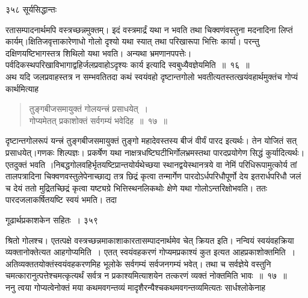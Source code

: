 \documentclass[11pt, openany]{book}
\begin{document}
\newpage


\noindent ३५८ \hspace{4cm} सूर्यसिद्धान्तः
\vspace{1cm}


\noindent रतासम्पादनार्थमपि वस्त्रच्छन्नमुक्तम्। इदं वस्त्रमार्द्रं यथा न भवति तथा चिक्वणंवस्तुना मदनादिना लिप्तं कार्यम्।क्षितिजवृत्ताकारेणाधो गोलो दृश्यो यथा स्यात् तथा परिखारूपा भित्तिः कार्या। परन्तु दक्षिणयष्टिभागस्तत्र शिथिलो यथा भवति। अन्यथा भ्रमणानपपत्तेः। पर्वदिकस्थपरिखाविभागाद्वहिर्जलप्रवाहोऽदृश्यः कार्य इत्यादि स्वबुध्यैवज्ञेयमिति~॥~१६~॥ \\
\noindent अथ यदि जलप्रवाहस्तत्र न सम्भवतितदा कथं स्वयंवहो दृष्टान्तगोलो भवतीत्यतस्तत्खयंवहार्थमुक्तंच गोप्यं कार्थमित्याह \textendash


 \begin{quote}
{\ssi तुङ्गबीजसमायुक्तं गोलयन्त्त्रं प्रसाधयेत्~।\\
गोप्यमेतत् प्रकाशोक्तं सर्वगम्यं भवेदिह~॥~१७~॥ }
\end{quote}
 दृष्टान्तगोलरूपं यन्त्त्रं तुङ्गबीजसमायुक्तं तुङ्गो महादेवस्तस्य बीजं वीर्यं पारद इत्यर्थः। तेन योजितं सत् प्रसाधयेत्।गणकः शिल्पज्ञः। प्रकर्षेण यथा नाक्षत्रधष्टिघटीभिर्गोलभ्रमस्तथा पारदप्रयोगेण सिद्धं कुर्यादित्यर्थः। एतदुक्तं भवति ।निबद्धगोलवहिर्भृतयष्टिप्रान्तयोर्यथेच्छया स्थानद्वयेस्थानत्रये वा नेमिं परिधिरूपामुत्कोर्य तां तालपत्रादिना चिक्वणवस्तुलेपेनाच्छाद्य तत्र छिद्रं कृत्वा तन्मार्गेण पारदोऽर्धपरिधौपूर्णो देय इतरार्धपरिधौ जलं च देयं ततो मुद्रितच्छिद्रं कृत्वा यष्ट्यग्रे भित्तिस्थनलिकथोः क्षेणे यथा गोलोऽन्तरिक्षोभवति। ततः पारदजलाकर्षितयष्टि स्वयं भमति। तदा \textendash



\newpage


\hspace{3cm} गूढार्थप्रकाशकेन सहितः~। \hfill ३५९
\vspace{1cm}


\noindent श्रितो गोलश्च। एतत्पक्षे वस्त्रच्छन्नमाकाशाकारतासम्पादनार्थमेव चेत् क्रियत इति। नन्वियं स्वयंवहक्रिया व्यक्तानोक्तेत्यत आह\textendash गोप्यमिति~। एतत् स्वयंवहकरणं गोप्यमप्रकाश्यं कुत इत्यत आह\textendash प्रकाशोक्तमिति~। अतिव्यक्ततयोक्तंस्वयंवहकरणमिह भूलोके सर्वगम्यं सर्वजनगम्यं भवेत्। तथा च सर्वज्ञेये वस्तुनि चमत्कारानुत्पत्तेश्चमत्कृत्यर्थं सर्वत्र न प्रकाश्यमित्याशयेन तत्करणं व्यक्तं नोक्तमिति भावः~॥~१७~॥\\
\noindent ननु त्वया गोप्यत्वेनोक्तं मया कथमवगन्तव्यं मादृशैरन्यैश्चकथमवगन्तव्यमित्यतः सार्धश्लोकेनाह\textendash
\end{document}
